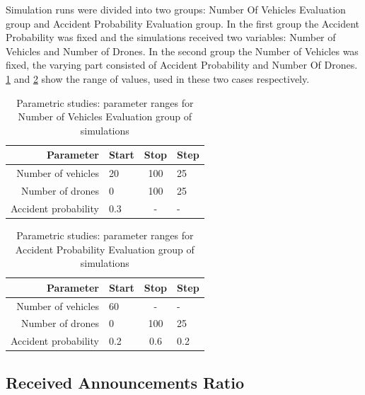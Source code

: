 \documentclass[]{nsm-thesis}
\begin{document}
Simulation runs were divided into two groups: Number Of Vehicles Evaluation group and Accident Probability Evaluation group. In the first group the Accident Probability was fixed and the simulations received two variables: Number of Vehicles and Number of Drones. In the second group the Number of Vehicles was fixed, the varying part consisted of Accident Probability and Number Of Drones. \cref{tab:inputrange1} and \cref{tab:inputrange2} show the range of values, used in these two cases respectively.

\begin{table}
    \centering
    \begin{tabular}{rlcl}
        \toprule
        Parameter & Start & Stop & Step \\
        \midrule
		Number of vehicles & 20 & 100 & 25 \\
		Number of drones & 0 & 100 & 25 \\
		Accident probability & 0.3 & - & - \\
        \bottomrule
    \end{tabular}
    \caption{Parametric studies: parameter ranges for Number of Vehicles Evaluation group of simulations}
    \label{tab:inputrange1}
\end{table}


\begin{table}
    \centering
    \begin{tabular}{rlcl}
        \toprule
        Parameter & Start & Stop & Step \\
        \midrule
		Number of vehicles & 60 & - & - \\
		Number of drones & 0 & 100 & 25 \\
		Accident probability & 0.2 & 0.6 & 0.2 \\
        \bottomrule
    \end{tabular}
    \caption{Parametric studies: parameter ranges for Accident Probability Evaluation group of simulations}
    \label{tab:inputrange2}
\end{table}

\subsection{Received Announcements Ratio}
\label{sec:ReceivedAnnouncementsRatio}
\end{document}
